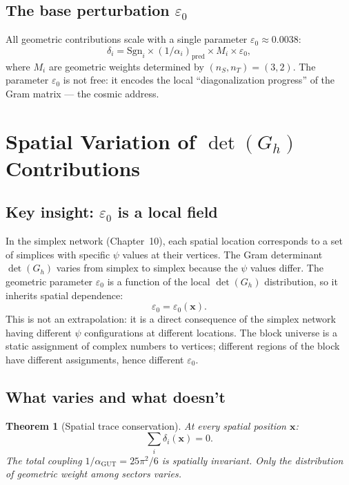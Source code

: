 \documentclass[12pt]{article}
\newtheorem{theorem}{Theorem}[section]
\theoremstyle{remark}
\begin{document}
\subsection{The base perturbation $\varepsilon_0$}

All geometric contributions scale with a single parameter $\varepsilon_0 \approx 0.0038$:
\begin{equation}
\delta_i = \text{Sgn}_i \times (1/\alpha_i)_\text{pred} \times M_i \times \varepsilon_0,
\end{equation}
where $M_i$ are geometric weights determined by $(n_S, n_T) = (3, 2)$. The parameter $\varepsilon_0$ is not free: it encodes the local ``diagonalization progress'' of the Gram matrix --- the cosmic address.

\section{Spatial Variation of $\det(G_h)$ Contributions}

\subsection{Key insight: $\varepsilon_0$ is a local field}

In the simplex network (Chapter~10), each spatial location corresponds to a set of simplices with specific $\psi$ values at their vertices. The Gram determinant $\det(G_h)$ varies from simplex to simplex because the $\psi$ values differ. The geometric parameter $\varepsilon_0$ is a function of the local $\det(G_h)$ distribution, so it inherits spatial dependence:
\begin{equation}
\varepsilon_0 = \varepsilon_0(\mathbf{x}).
\end{equation}
This is not an extrapolation: it is a direct consequence of the simplex network having different $\psi$ configurations at different locations. The block universe is a static assignment of complex numbers to vertices; different regions of the block have different assignments, hence different $\varepsilon_0$.

\subsection{What varies and what doesn't}

\begin{theorem}[Spatial trace conservation]
At every spatial position $\mathbf{x}$:
\begin{equation}
\sum_i \delta_i(\mathbf{x}) = 0.
\end{equation}
The total coupling $1/\alpha_\text{GUT} = 25\pi^2/6$ is spatially invariant. Only the distribution of geometric weight among sectors varies.
\end{theorem}
\end{document}
